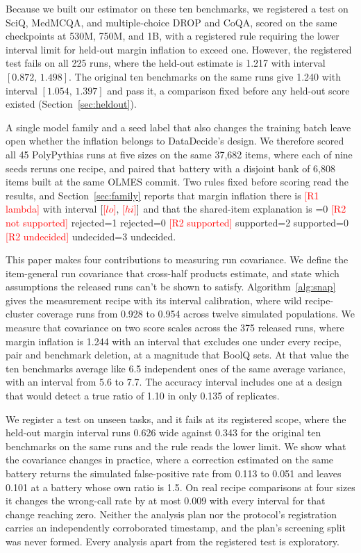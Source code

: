 \documentclass{article}
\newcommand{\ci}[2]{\ensuremath{[#1,\,#2]}}
\newcommand{\pending}[1]{\textcolor{red}{[#1]}}
\newcommand{\Rtwocase}{0}
\newcommand{\outcome}[4]{\ifnum#1=0 \pending{#3} #4\else\ifnum#1=#2 #4\fi\fi}
\begin{document}
Because we built our estimator on these ten benchmarks, we registered a test on SciQ, MedMCQA, and multiple-choice DROP and CoQA, scored on the same checkpoints at 530M, 750M, and 1B, with a registered rule requiring the lower interval limit for held-out margin inflation to exceed one. However, the registered test fails on all 225 runs, where the held-out estimate is 1.217 with interval \ci{0.872}{1.498}. The original ten benchmarks on the same runs give 1.240 with interval \ci{1.054}{1.397} and pass it, a comparison fixed before any held-out score existed (Section~\ref{sec:heldout}).

A single model family and a seed label that also changes the training batch leave open whether the inflation belongs to DataDecide's design. We therefore scored all 45 PolyPythias runs at five sizes on the same 37,682 items, where each of nine seeds reruns one recipe, and paired that battery with a disjoint bank of 6,808 items built at the same OLMES commit. Two rules fixed before scoring read the results, and Section~\ref{sec:family} reports that margin inflation there is \pending{R1 lambda} with interval \ci{\pending{lo}}{\pending{hi}} and that the shared-item explanation is \outcome{\Rtwocase}{1}{R2 not supported}{rejected}\outcome{\Rtwocase}{2}{R2 supported}{supported}\outcome{\Rtwocase}{3}{R2 undecided}{undecided}.

This paper makes four contributions to measuring run covariance. We define the item-general run covariance that cross-half products estimate, and state which assumptions the released runs can't be shown to satisfy. Algorithm~\ref{alg:snap} gives the measurement recipe with its interval calibration, where wild recipe-cluster coverage runs from 0.928 to 0.954 across twelve simulated populations. We measure that covariance on two score scales across the 375 released runs, where margin inflation is 1.244 with an interval that excludes one under every recipe, pair and benchmark deletion, at a magnitude that BoolQ sets. At that value the ten benchmarks average like 6.5 independent ones of the same average variance, with an interval from 5.6 to 7.7. The accuracy interval includes one at a design that would detect a true ratio of 1.10 in only 0.135 of replicates.

We register a test on unseen tasks, and it fails at its registered scope, where the held-out margin interval runs 0.626 wide against 0.343 for the original ten benchmarks on the same runs and the rule reads the lower limit. We show what the covariance changes in practice, where a correction estimated on the same battery returns the simulated false-positive rate from 0.113 to 0.051 and leaves 0.101 at a battery whose own ratio is 1.5. On real recipe comparisons at four sizes it changes the wrong-call rate by at most 0.009 with every interval for that change reaching zero. Neither the analysis plan nor the protocol's registration carries an independently corroborated timestamp, and the plan's screening split was never formed. Every analysis apart from the registered test is exploratory.
\end{document}
